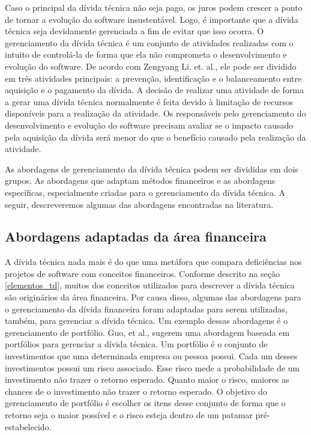 Caso o principal da dívida técnica não seja pago, os juros podem crescer a ponto de tornar a evolução do software insustentável. Logo, é importante que a dívida técnica seja devidamente gerenciada a fim de evitar que isso ocorra\cite{power2013understanding}. O gerenciamento da dívida técnica é um conjunto de atividades realizadas com o intuito de controlá-la de forma que ela não comprometa o desenvolvimento e evolução do software. De acordo com Zengyang Li. et. al.\cite{li2015systematic}, ele pode ser dividido em três atividades principais: a prevenção, identificação e o balanceamento entre aquisição e o pagamento da dívida.  A decisão de realizar uma atividade de forma a gerar uma dívida técnica normalmente é feita devido à limitação de recursos disponíveis para a realização da atividade.  Os responsáveis pelo gerenciamento do desenvolvimento e evolução do software precisam avaliar se o impacto causado pela aquisição da dívida será menor do que o benefício causado pela realização da atividade.  
 
As abordagens de gerenciamento da dívida técnica podem ser divididas em dois grupos. As abordagens que adaptam métodos financeiros e as abordagens específicas, especialmente criadas para o gerenciamento da dívida técnica. A seguir, descreveremos algumas das abordagens encontradas na literatura.


\subsection{Abordagens adaptadas da área financeira}

 A dívida técnica nada mais é do que uma metáfora que compara deficiências nos projetos de software com conceitos financeiros. Conforme descrito na seção \ref{elementos_td}, muitos dos conceitos utilizados para descrever a dívida técnica são originários da área financeira. Por causa disso, algumas das abordagens para o gerenciamento da dívida financeira foram adaptadas para serem utilizadas, também, para gerenciar a dívida técnica. Um exemplo dessas abordagens é o gerenciamento de portfólio. \cite{guo2011portfolio} Guo, et al., sugerem uma abordagem baseada em portfólios para gerenciar a dívida técnica. Um portfólio é o conjunto de investimentos que uma determinada empresa ou pessoa possui. Cada um desses investimentos possui um risco associado. Esse risco mede a probabilidade de um investimento não trazer o retorno esperado. Quanto maior o risco, maiores as chances de o investimento não trazer o retorno esperado. O objetivo do gerenciamento de portfólio é escolher os itens desse conjunto de forma que o retorno seja o maior possível e o risco esteja dentro de um patamar pré-estabelecido. 


